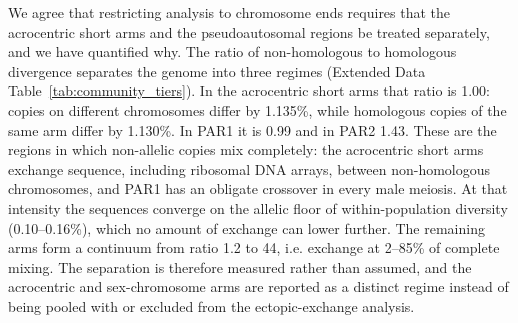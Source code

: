 
We agree that restricting analysis to chromosome ends requires that the
acrocentric short arms and the pseudoautosomal regions be treated separately,
and we have quantified why. The ratio of non-homologous to homologous divergence
separates the genome into three regimes (Extended Data Table~\ref{tab:community_tiers}).
In the acrocentric short arms that ratio is 1.00: copies on different
chromosomes differ by 1.135\%, while homologous copies of the same arm differ by
1.130\%. In PAR1 it is 0.99 and in PAR2 1.43. These are the regions in which
non-allelic copies mix completely: the acrocentric short arms exchange sequence,
including ribosomal DNA arrays, between non-homologous chromosomes, and PAR1 has an
obligate crossover in every male meiosis. At that intensity the sequences
converge on the allelic floor of within-population diversity (0.10--0.16\%),
which no amount of exchange can lower further. The remaining arms form a
continuum from ratio 1.2 to 44, i.e. exchange at 2--85\% of complete mixing.
The separation is therefore measured rather than assumed, and the acrocentric
and sex-chromosome arms are reported as a distinct regime instead of being
pooled with or excluded from the ectopic-exchange analysis.
